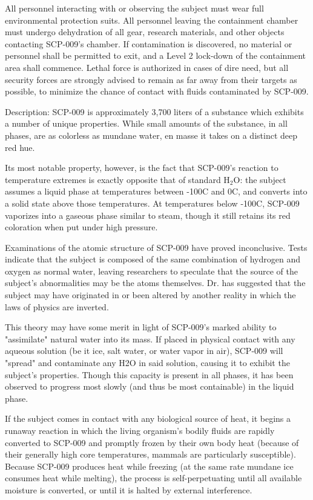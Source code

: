 All personnel interacting with or observing the subject must wear full environmental protection suits. All personnel leaving the containment chamber must undergo dehydration of all gear, research materials, and other objects contacting SCP-009's chamber. If contamination is discovered, no material or personnel shall be permitted to exit, and a Level 2 lock-down of the containment area shall commence. Lethal force is authorized in cases of dire need, but all security forces are strongly advised to remain as far away from their targets as possible, to minimize the chance of contact with fluids contaminated by SCP-009.

Description: SCP-009 is approximately 3,700 liters of a substance which exhibits a number of unique properties. While small amounts of the substance, in all phases, are as colorless as mundane water, en masse it takes on a distinct deep red hue.

Its most notable property, however, is the fact that SCP-009's reaction to temperature extremes is exactly opposite that of standard H$_{2}$O: the subject assumes a liquid phase at temperatures between -100\degree C and 0\degree C, and converts into a solid state above those temperatures. At temperatures below -100\degree C, SCP-009 vaporizes into a gaseous phase similar to steam, though it still retains its red coloration when put under high pressure.

Examinations of the atomic structure of SCP-009 have proved inconclusive. Tests indicate that the subject is composed of the same combination of hydrogen and oxygen as normal water, leaving researchers to speculate that the source of the subject's abnormalities may be the atoms themselves. Dr.  has suggested that the subject may have originated in or been altered by another reality in which the laws of physics are inverted.

This theory may have some merit in light of SCP-009's marked ability to "assimilate" natural water into its mass. If placed in physical contact with any aqueous solution (be it ice, salt water, or water vapor in air), SCP-009 will "spread" and contaminate any H2O in said solution, causing it to exhibit the subject's properties. Though this capacity is present in all phases, it has been observed to progress most slowly (and thus be most containable) in the liquid phase.

If the subject comes in contact with any biological source of heat, it begins a runaway reaction in which the living organism's bodily fluids are rapidly converted to SCP-009 and promptly frozen by their own body heat (because of their generally high core temperatures, mammals are particularly susceptible). Because SCP-009 produces heat while freezing (at the same rate mundane ice consumes heat while melting), the process is self-perpetuating until all available moisture is converted, or until it is halted by external interference.

